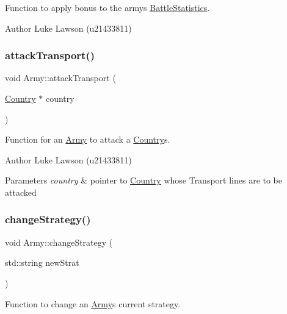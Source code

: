 Function to apply bonus to the army\textquotesingle{}s \mbox{\hyperlink{class_battle_statistics}{Battle\+Statistics}}. 

\begin{DoxyAuthor}{Author}
Luke Lawson (u21433811) 
\end{DoxyAuthor}
\mbox{\label{class_army_a6038ff12345f993b2aab1740a9f0a6a6}} 
\subsubsection{\texorpdfstring{attackTransport()}{attackTransport()}}
{\footnotesize\ttfamily void Army\+::attack\+Transport (\begin{DoxyParamCaption}\item[{\mbox{\hyperlink{class_country}{Country}} $\ast$}]{country }\end{DoxyParamCaption})}



Function for an \mbox{\hyperlink{class_army}{Army}} to attack a \mbox{\hyperlink{class_country}{Country}}\textquotesingle{}s. 

\begin{DoxyAuthor}{Author}
Luke Lawson (u21433811) 
\end{DoxyAuthor}

\begin{DoxyParams}{Parameters}
{\em country} & pointer to \mbox{\hyperlink{class_country}{Country}} whose Transport lines are to be attacked \\
\hline
\end{DoxyParams}
\mbox{\label{class_army_a81abf74b10e24a8f2fd2666d1ce54239}} 
\subsubsection{\texorpdfstring{changeStrategy()}{changeStrategy()}}
{\footnotesize\ttfamily void Army\+::change\+Strategy (\begin{DoxyParamCaption}\item[{std\+::string}]{new\+Strat }\end{DoxyParamCaption})}



Function to change an \mbox{\hyperlink{class_army}{Army}}\textquotesingle{}s current strategy. 

